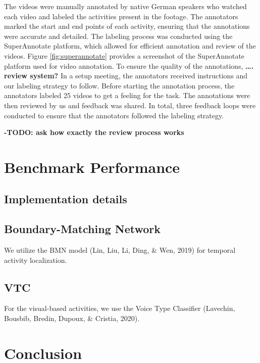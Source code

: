 \documentclass[
  man,floatsintext]{apa6}
\begin{document}
The videos were manually annotated by native German speakers who watched each video and labeled the activities present in the footage. The annotators marked the start and end points of each activity, ensuring that the annotations were accurate and detailed. The labeling process was conducted using the SuperAnnotate platform, which allowed for efficient annotation and review of the videos. Figure \ref{fig:superannotate} provides a screenshot of the SuperAnnotate platform used for video annotation. To ensure the quality of the annotations, \textbf{\ldots. review system?} In a setup meeting, the annotators received instructions and our labeling strategy to follow. Before starting the annotation process, the annotators labeled 25 videos to get a feeling for the task. The annotations were then reviewed by us and feedback was shared. In total, three feedback loops were conducted to ensure that the annotators followed the labeling strategy.

\textbf{-TODO: ask how exactly the review process works}

\section{Benchmark Performance}\label{benchmark-performance}

\subsection{Implementation details}\label{implementation-details}

\subsection{Boundary-Matching Network}\label{boundary-matching-network}

We utilize the BMN model (Lin, Liu, Li, Ding, \& Wen, 2019) for temporal activity localization.

\subsection{VTC}\label{vtc}

For the visual-based activities, we use the Voice Type Classifier (Lavechin, Bousbib, Bredin, Dupoux, \& Cristia, 2020).

\section{Conclusion}\label{conclusion}
\end{document}
